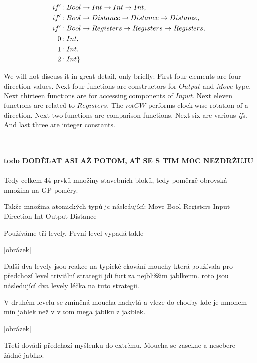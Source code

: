 \documentclass[12pt,a4paper]{report}
\begin{document}
\begin{align*}
if'              &: Bool \rightarrow Int \rightarrow Int \rightarrow Int                    ,\\     
if'              &: Bool \rightarrow Distance \rightarrow Distance \rightarrow Distance     ,\\        
if'              &: Bool \rightarrow Registers \rightarrow Registers \rightarrow Registers  ,\\                           
0                &: Int                                             ,\\                                     
1                &: Int                                             ,\\                                    
2                &: Int                                             \}\\
\end{align*}

We will not discuss it in great detail, only briefly: First four 
elements are four direction values. Next four functions are
constructors for $Output$ and $Move$ type. Next thirteen functions
are for accessing components of $Input$. Next eleven functions are 
related to $Registers$. The $rotCW$ performs clock-wise rotation of a direction.
Next two functions are comparison functions. Next six are various \textit{if}s. And last 
three are integer constants. 


~\\\\\textbf{todo DODĚLAT ASI AŽ POTOM, AŤ SE S TIM MOC NEZDRŽUJU}\\\\

Tedy celkem 44 prvků množiny stavebních bloků, tedy poměrně obrovská množina
na GP poměry.

Takže množina atomických typů je následující:
Move Bool Registers Input Direction Int Output Distance

Používáme tři levely. První level vypadá takle

[obrázek]

Další dva levely jsou reakce na typické chování mouchy 
která používala pro předchozí level triviální strategii
jdi furt za nejbližšim jablkemn. roto jsou následující dva levely 
léčka na tuto strategii.

V druhém levelu se zmíněná moucha nachytá a vleze do 
chodby kde je mnohem mín jablek než v v tom mega jablku z jakblek.

[obrázek]

Třetí dovádí předchozí myšlenku do extrému. 
Moucha se zasekne a nesebere žádné jablko.
\end{document}
